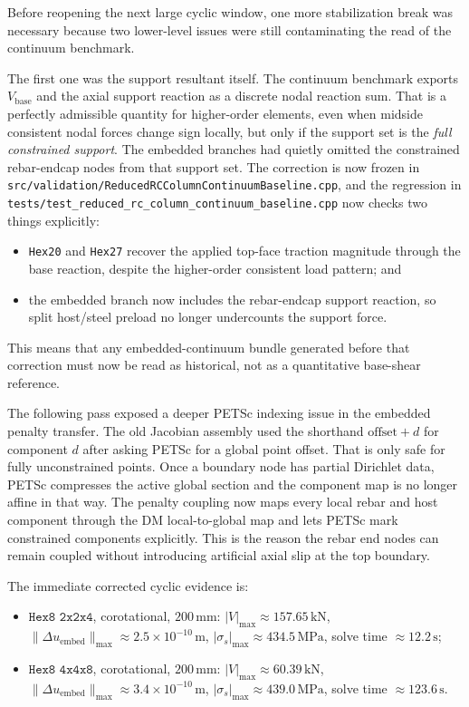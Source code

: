 Before reopening the next large cyclic window, one more stabilization break was
necessary because two lower-level issues were still contaminating the read of
the continuum benchmark.

The first one was the support resultant itself. The continuum benchmark exports
\(V_{\mathrm{base}}\) and the axial support reaction as a discrete nodal
reaction sum. That is a perfectly admissible quantity for higher-order
elements, even when midside consistent nodal forces change sign locally, but
only if the support set is the \emph{full constrained support}. The embedded
branches had quietly omitted the constrained rebar-endcap nodes from that
support set. The correction is now frozen in
\texttt{src/validation/ReducedRCColumnContinuumBaseline.cpp}, and the
regression in
\texttt{tests/test\_reduced\_rc\_column\_continuum\_baseline.cpp} now checks
two things explicitly:
\begin{itemize}
  \item \texttt{Hex20} and \texttt{Hex27} recover the applied top-face traction
    magnitude through the base reaction, despite the higher-order consistent
    load pattern; and
  \item the embedded branch now includes the rebar-endcap support reaction, so
    split host/steel preload no longer undercounts the support force.
\end{itemize}
This means that any embedded-continuum bundle generated before that correction
must now be read as historical, not as a quantitative base-shear reference.

The following pass exposed a deeper PETSc indexing issue in the embedded
penalty transfer.  The old Jacobian assembly used the shorthand
\(\mathrm{offset}+d\) for component \(d\) after asking PETSc for a global point
offset.  That is only safe for fully unconstrained points.  Once a boundary
node has partial Dirichlet data, PETSc compresses the active global section and
the component map is no longer affine in that way.  The penalty coupling now
maps every local rebar and host component through the DM local-to-global map
and lets PETSc mark constrained components explicitly.  This is the reason the
rebar end nodes can remain coupled without introducing artificial axial slip at
the top boundary.

The immediate corrected cyclic evidence is:
\begin{itemize}
  \item \(\texttt{Hex8 2x2x4}\), corotational,
    \(200\,\mathrm{mm}\): \(|V|_{\max}\approx157.65\,\mathrm{kN}\),
    \(\|\Delta u_{\mathrm{embed}}\|_{\max}\approx2.5\times10^{-10}\,\mathrm{m}\),
    \(|\sigma_s|_{\max}\approx434.5\,\mathrm{MPa}\), solve time
    \(\approx12.2\,\mathrm{s}\);
  \item \(\texttt{Hex8 4x4x8}\), corotational,
    \(200\,\mathrm{mm}\): \(|V|_{\max}\approx60.39\,\mathrm{kN}\),
    \(\|\Delta u_{\mathrm{embed}}\|_{\max}\approx3.4\times10^{-10}\,\mathrm{m}\),
    \(|\sigma_s|_{\max}\approx439.0\,\mathrm{MPa}\), solve time
    \(\approx123.6\,\mathrm{s}\).
\end{itemize}


